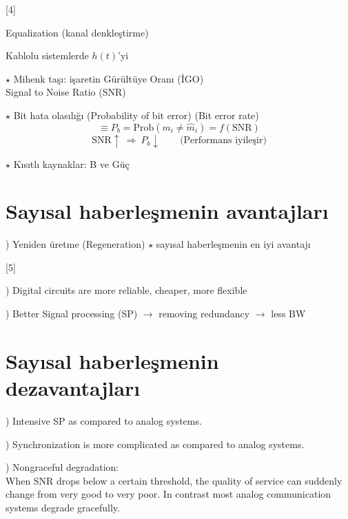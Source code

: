 \documentclass[11pt,a4paper]{article}
\begin{document}
[4]

\noindent Equalization (kanal denkleştirme)

\noindent Kablolu sistemlerde $h(t)$'yi 

\noindent \textcolor{kirmizikalem}{$\star$} Mihenk taşı: işaretin Gürültüye Oranı (İGO)\\
Signal to Noise Ratio (SNR)

\noindent \textcolor{kirmizikalem}{$\star$} Bit hata olasılığı (Probability of bit error) (Bit error rate)
\[ \equiv P_b = \mathrm{Prob}(m_i \neq \hat m_i) = f(\mathrm{SNR}) \]
\[ \mathrm{SNR}\uparrow \ \Rightarrow\ P_b\downarrow \qquad \text{(Performans iyileşir)} \]

\noindent \textcolor{kirmizikalem}{$\star$} Kısıtlı kaynaklar: B ve Güç
\section{Sayısal haberleşmenin avantajları}
) Yeniden üretme (Regeneration) \quad \textcolor{kirmizikalem}{$\star$ sayısal haberleşmenin en iyi avantajı}

[5]

) Digital circuits are more reliable, cheaper, more flexible

) Better Signal processing (SP) $\longrightarrow$ removing redundancy $\rightarrow$ less BW
\section{Sayısal haberleşmenin dezavantajları}
) Intensive SP as compared to analog systems.

) Synchronization is more complicated as compared to analog systems.

) Nongraceful degradation:\\
When SNR drops below a certain threshold, the quality of service can suddenly change from very good to very poor. In contrast most analog communication systems degrade gracefully.
\end{document}
